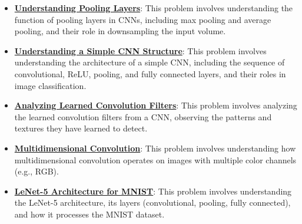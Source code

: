 \documentclass{article}%
\begin{document}
\begin{itemize}[leftmargin=*]
\item \href{https://purdue.brightspace.com/d2l/common/assets/pdfjs-d2l-dist/1.0.14-legacy/web/viewer.html?file=\%2Fcontent\%2Fenforced\%2F1095467-wl.202510.CS.24300.001\%2F09L1-cnn.pdf\%3Fou\%3D1095467\&lang=en-us\&container=d2l-fileviewer-rendered-pdf\&fullscreen=d2l-fileviewer-rendered-pdf-dialog\&height=667#page=14}{\textbf{Understanding Pooling Layers}}: This problem involves understanding the function of pooling layers in CNNs, including max pooling and average pooling, and their role in downsampling the input volume.%
\item \href{https://purdue.brightspace.com/d2l/common/assets/pdfjs-d2l-dist/1.0.14-legacy/web/viewer.html?file=\%2Fcontent\%2Fenforced\%2F1095467-wl.202510.CS.24300.001\%2F09L1-cnn.pdf\%3Fou\%3D1095467\&lang=en-us\&container=d2l-fileviewer-rendered-pdf\&fullscreen=d2l-fileviewer-rendered-pdf-dialog\&height=667#page=17}{\textbf{Understanding a Simple CNN Structure}}: This problem involves understanding the architecture of a simple CNN, including the sequence of convolutional, ReLU, pooling, and fully connected layers, and their roles in image classification.%
\item \href{https://purdue.brightspace.com/d2l/common/assets/pdfjs-d2l-dist/1.0.14-legacy/web/viewer.html?file=\%2Fcontent\%2Fenforced\%2F1095467-wl.202510.CS.24300.001\%2F09L1-cnn.pdf\%3Fou\%3D1095467\&lang=en-us\&container=d2l-fileviewer-rendered-pdf\&fullscreen=d2l-fileviewer-rendered-pdf-dialog\&height=667#page=18}{\textbf{Analyzing Learned Convolution Filters}}: This problem involves analyzing the learned convolution filters from a CNN, observing the patterns and textures they have learned to detect.%
\item \href{https://purdue.brightspace.com/d2l/common/assets/pdfjs-d2l-dist/1.0.14-legacy/web/viewer.html?file=\%2Fcontent\%2Fenforced\%2F1095467-wl.202510.CS.24300.001\%2F09L1-cnn.pdf\%3Fou\%3D1095467\&lang=en-us\&container=d2l-fileviewer-rendered-pdf\&fullscreen=d2l-fileviewer-rendered-pdf-dialog\&height=667#page=19}{\textbf{Multidimensional Convolution}}: This problem involves understanding how multidimensional convolution operates on images with multiple color channels (e.g., RGB).%
\item \href{https://purdue.brightspace.com/d2l/common/assets/pdfjs-d2l-dist/1.0.14-legacy/web/viewer.html?file=\%2Fcontent\%2Fenforced\%2F1095467-wl.202510.CS.24300.001\%2F09L1-cnn.pdf\%3Fou\%3D1095467\&lang=en-us\&container=d2l-fileviewer-rendered-pdf\&fullscreen=d2l-fileviewer-rendered-pdf-dialog\&height=667#page=22}{\textbf{LeNet-5 Architecture for MNIST}}: This problem involves understanding the LeNet-5 architecture, its layers (convolutional, pooling, fully connected), and how it processes the MNIST dataset.%

\end{itemize}
\end{document}
